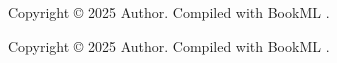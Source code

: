 \documentclass[oneside,11pt]{amsart}
\begin{document}
\begin{lxFooter}
  Copyright \copyright{} 2025 Author. Compiled with BookML \BookMLversion.
\end{lxFooter}

\iflatexml\else
\bigskip
\begin{center}
  {\small Copyright \copyright{} 2025 Author. Compiled with BookML \BookMLversion.}
\end{center}
\fi
\end{document}
